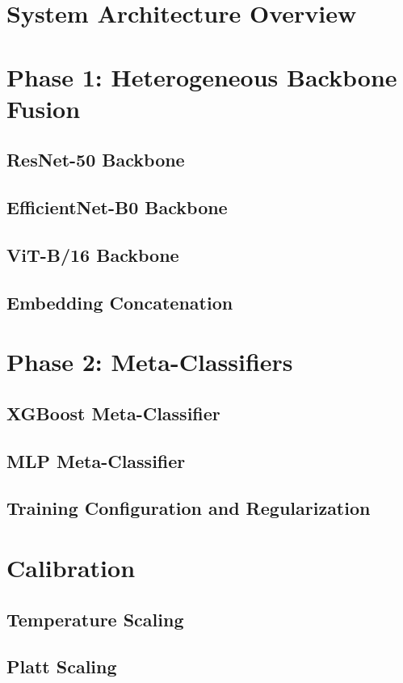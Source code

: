 \documentclass[12pt,a4paper]{book}
\theoremstyle{definition}
\theoremstyle{remark}
\begin{document}
\section{System Architecture Overview}\label{sec:architecture}

\section{Phase 1: Heterogeneous Backbone Fusion}\label{sec:fusion}
\subsection{ResNet-50 Backbone}
\subsection{EfficientNet-B0 Backbone}
\subsection{ViT-B/16 Backbone}
\subsection{Embedding Concatenation}

\section{Phase 2: Meta-Classifiers}\label{sec:meta-clf}
\subsection{XGBoost Meta-Classifier}
\subsection{MLP Meta-Classifier}
\subsection{Training Configuration and Regularization}

\section{Calibration}\label{sec:calibration}
\subsection{Temperature Scaling}
\subsection{Platt Scaling}
\end{document}
